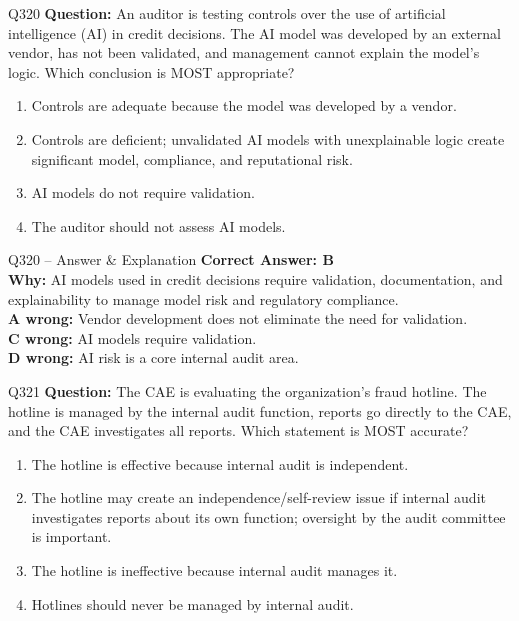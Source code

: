 \documentclass[aspectratio=169,10pt]{beamer}
\begin{document}
	\begin{frame}[t]{Q320}
		\small
		\textbf{Question:} An auditor is testing controls over the use of artificial intelligence (AI) in credit decisions. The AI model was developed by an external vendor, has not been validated, and management cannot explain the model's logic. Which conclusion is MOST appropriate?
		\begin{enumerate}[label=\Alph*.,itemsep=1pt,topsep=2pt]
			\item Controls are adequate because the model was developed by a vendor.
			\item Controls are deficient; unvalidated AI models with unexplainable logic create significant model, compliance, and reputational risk.
			\item AI models do not require validation.
			\item The auditor should not assess AI models.
		\end{enumerate}
	\end{frame}
	
	\begin{frame}[t]{Q320 -- Answer \& Explanation}
		\small
		\textbf{Correct Answer: B} \\[4pt]
		\textbf{Why:} AI models used in credit decisions require validation, documentation, and explainability to manage model risk and regulatory compliance. \\[4pt]
		\textbf{A wrong:} Vendor development does not eliminate the need for validation. \\[2pt]
		\textbf{C wrong:} AI models require validation. \\[2pt]
		\textbf{D wrong:} AI risk is a core internal audit area.
	\end{frame}
	
	\begin{frame}[t]{Q321}
		\small
		\textbf{Question:} The CAE is evaluating the organization's fraud hotline. The hotline is managed by the internal audit function, reports go directly to the CAE, and the CAE investigates all reports. Which statement is MOST accurate?
		\begin{enumerate}[label=\Alph*.,itemsep=1pt,topsep=2pt]
			\item The hotline is effective because internal audit is independent.
			\item The hotline may create an independence/self-review issue if internal audit investigates reports about its own function; oversight by the audit committee is important.
			\item The hotline is ineffective because internal audit manages it.
			\item Hotlines should never be managed by internal audit.
		\end{enumerate}
	\end{frame}
	
\end{document}
